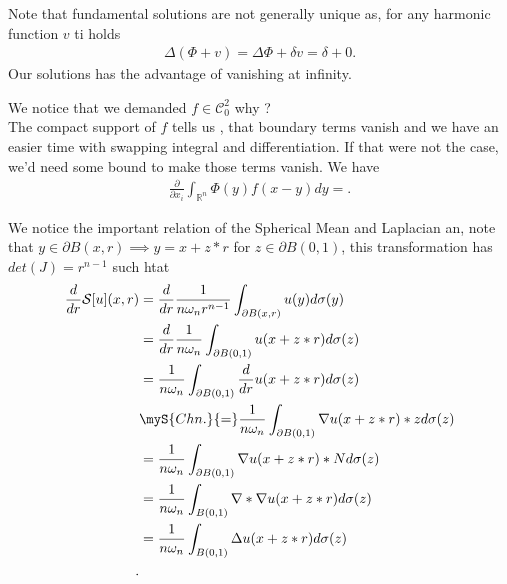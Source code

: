 \begin{corollary}
 Note that fundamental solutions are not generally unique as, for any harmonic function $v$ ti holds 
 \begin{align*}
  \Delta (\Phi  + v) = \Delta  \Phi  + \delta v  = \delta  + 0
 .\end{align*}
 Our solutions has the advantage of vanishing at infinity.
\end{corollary}
\begin{corollary}
  We notice that we demanded $f \in  \mathcal{C}^{2}_0 $ why ? \\[1ex]
  The compact support of $f$ tells us , that boundary terms vanish  and we have an easier time with swapping integral and differentiation.
  If that were not the case, we'd need some bound to make those terms vanish.
  We have 
  \begin{align*}
    \frac{\partial }{\partial x_i}   \int_{\mathbb{R}^{n} } \Phi(y) f(x-y) dy = 
  .\end{align*}
\end{corollary}
\begin{note}
 We notice the important relation of the Spherical Mean and Laplacian an, note that $y \in  \partial B(x,r) \implies y = x+z*r $ for $z \in  \partial B(0,1)$,
 this transformation has $det(J) = r^{n-1} $ such htat
 \begin{align*}
   \frac{d}{dr} \mathcal{S}[u](x,r) &= \frac{d}{dr} \frac{1}{n \omega_n r^{n-1} } \int_{\partial B(x,r)} u(y) d \sigma(y)\\
                                    &= \frac{d}{dr} \frac{1}{n \omega_n } \int_{\partial B(0,1)} u(x+z*r) d \sigma(z)\\
                                    &= \frac{1}{n \omega_n } \int_{\partial B(0,1)} \frac{d}{dr} u(x+z*r) d \sigma(z)\\
                                    &\myS{Chn.}{=} \frac{1}{n \omega_n } \int_{\partial B(0,1)} \nabla u(x+z*r)*z d \sigma(z)\\
                                    &= \frac{1}{n \omega_n } \int_{\partial B(0,1)} \nabla u(x+z*r)*N d \sigma(z)\\
                                    &= \frac{1}{n \omega_n } \int_{B(0,1)} \nabla * \nabla u(x+z*r) d \sigma(z)\\
                                    &= \frac{1}{n \omega_n } \int_{B(0,1)} \Delta  u(x+z*r) d \sigma(z)\\
 .\end{align*}
\end{note}
